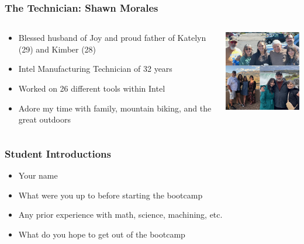 \documentclass{beamer}
\begin{document}
\begin{frame}
\frametitle{The Technician: Shawn Morales}
\begin{columns}
\begin{column}{6cm}
\begin{itemize}
\item Blessed husband of Joy and proud father of Katelyn (29) and Kimber (28)
\item Intel Manufacturing Technician of 32 years
\item Worked on 26 different tools within Intel
\item Adore my time with family, mountain biking, and the great outdoors
\end{itemize}
\end{column}
\begin{column}{5cm}
\begin{center}
\includegraphics[width=4.5cm]{fig/shawn.jpg}
\end{center}
\end{column}
\end{columns}
\end{frame}

\begin{frame}\frametitle{Student Introductions}
\begin{itemize}
\item Your name
\item What were you up to before starting the bootcamp
\item Any prior experience with math, science, machining, etc.
\item What do you hope to get out of the bootcamp
\end{itemize}
\end{frame}
\end{document}
